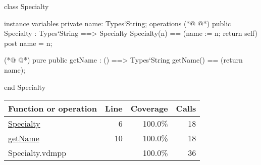 \begin{vdmpp}[breaklines=true]
class Specialty

instance variables
  private name: Types`String;
operations
(*@
\label{Specialty:6}
@*)
 public Specialty : Types`String ==> Specialty
  Specialty(n) == (name := n; return self)
 post name = n;
  
(*@
\label{getName:10}
@*)
 pure public getName : () ==> Types`String
  getName() == (return name);

end Specialty
\end{vdmpp}
\bigskip
\begin{longtable}{|l|r|r|r|}
\hline
Function or operation & Line & Coverage & Calls \\
\hline
\hline
\hyperref[Specialty:6]{Specialty} & 6&100.0\% & 18 \\
\hline
\hyperref[getName:10]{getName} & 10&100.0\% & 18 \\
\hline
\hline
Specialty.vdmpp & & 100.0\% & 36 \\
\hline
\end{longtable}


